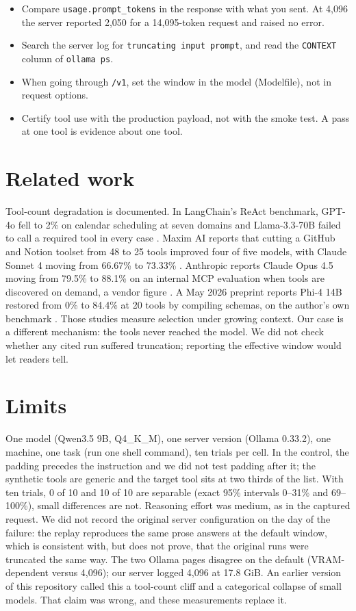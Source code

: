 \documentclass[10pt]{article}
\begin{document}
\begin{itemize}
\item Compare \texttt{usage.prompt\_tokens} in the response with what you sent. At 4,096 the server reported 2,050 for a 14,095-token request and raised no error.
\item Search the server log for \texttt{truncating input prompt}, and read the \texttt{CONTEXT} column of \texttt{ollama ps}.
\item When going through \texttt{/v1}, set the window in the model (Modelfile), not in request options.
\item Certify tool use with the production payload, not with the smoke test. A pass at one tool is evidence about one tool.
\end{itemize}

\section{Related work}

Tool-count degradation is documented. In LangChain's ReAct benchmark, GPT-4o fell to 2\% on calendar scheduling at seven domains and Llama-3.3-70B failed to call a required tool in every case \cite{langchain}. Maxim AI reports that cutting a GitHub and Notion toolset from 48 to 25 tools improved four of five models, with Claude Sonnet 4 moving from 66.67\% to 73.33\% \cite{maxim}. Anthropic reports Claude Opus 4.5 moving from 79.5\% to 88.1\% on an internal MCP evaluation when tools are discovered on demand, a vendor figure \cite{anthropic}. A May 2026 preprint reports Phi-4 14B restored from 0\% to 84.4\% at 20 tools by compiling schemas, on the author's own benchmark \cite{tscg}. Those studies measure selection under growing context. Our case is a different mechanism: the tools never reached the model. We did not check whether any cited run suffered truncation; reporting the effective window would let readers tell.

\section*{Limits}

One model (Qwen3.5 9B, Q4\_K\_M), one server version (Ollama 0.33.2), one machine, one task (run one shell command), ten trials per cell. In the control, the padding precedes the instruction and we did not test padding after it; the synthetic tools are generic and the target tool sits at two thirds of the list. With ten trials, 0 of 10 and 10 of 10 are separable (exact 95\% intervals 0--31\% and 69--100\%), small differences are not. Reasoning effort was medium, as in the captured request. We did not record the original server configuration on the day of the failure: the replay reproduces the same prose answers at the default window, which is consistent with, but does not prove, that the original runs were truncated the same way. The two Ollama pages disagree on the default (VRAM-dependent versus 4,096); our server logged 4,096 at 17.8 GiB. An earlier version of this repository called this a tool-count cliff and a categorical collapse of small models. That claim was wrong, and these measurements replace it.
\end{document}
